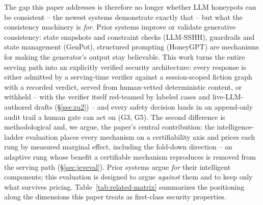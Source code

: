 The gap this paper addresses is therefore no longer whether LLM honeypots
can be consistent -- the newest systems demonstrate exactly that -- but
what the consistency machinery is \emph{for}. Prior systems improve or
validate generative consistency: state snapshots and constraint checks
(LLM-SSHH), guardrails and state management (GenPot), structured
prompting (HoneyGPT) are mechanisms for making the generator's output
stay believable. This work turns the entire serving path into an
explicitly verified security architecture: every response is either
admitted by a serving-time verifier against a session-scoped fiction
graph with a recorded verdict, served from human-vetted deterministic
content, or withheld -- with the verifier itself red-teamed by labeled
cases and live-LLM-authored drafts (\S\ref{sec:rq2}) -- and every safety
decision lands in an append-only audit trail a human gate can act on
(G3, G5). The second difference is methodological and, we argue, the
paper's central contribution: the intelligence-ladder evaluation places
every mechanism on a certifiability axis and prices each rung by measured
marginal effect, including the fold-down direction -- an adaptive rung
whose benefit a certifiable mechanism reproduces is removed from the
serving path (\S\ref{sec:jeveval}). Prior systems argue \emph{for} their
intelligent components; this evaluation is designed to argue
\emph{against} them and to keep only what survives pricing.
Table~\ref{tab:related-matrix} summarizes the positioning along the
dimensions this paper treats as first-class security properties.

